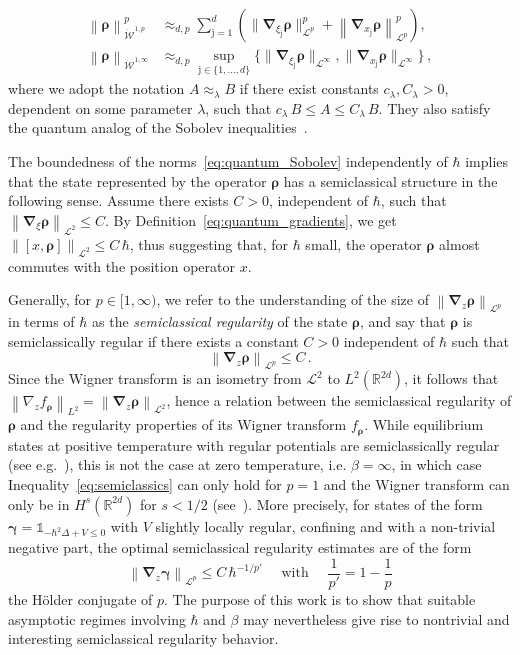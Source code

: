 \documentclass[11pt]{amsart}
\theoremstyle{plain}
\theoremstyle{definition}
\newcommand		{\N}		{\mathbb N}			%
\newcommand		{\RR}		{\mathbb R}			%
\newcommand		{\R}		{\RR}
\newcommand		{\Rdd}		{\R^{2d}}
\renewcommand	{\L}		{\mathcal L}		%
\newcommand		{\cW}		{\mathcal W}		%
\newcommand		{\lt}			{\left}				%
\newcommand		{\rt}			{\right}			%
\renewcommand	{\(}			{\lt(}
\renewcommand	{\)}			{\rt)}
\newcommand		{\com}[1]		{\lt[{#1}\rt]}		%
\newcommand		{\snrm}[1]		{\lVert #1 \rVert}			%
\newcommand		{\nrm}[1]		{\lt\lVert #1\rt\rVert}
\newcommand		{\Nrm}[2]		{\nrm{#1}_{#2}}
\newcommand		{\sNrm}[2]		{\snrm{#1}_{#2}}
\newcommand		{\indic}	{\mathds{1}}		%
\newcommand		{\jj}			{\mathrm{j}}	%
\newcommand		{\op}		{{\boldsymbol{\rho}}}%
\newcommand		{\opgam}	{{\boldsymbol{\gamma}}}	%
\newcommand		{\Dh}		{\boldsymbol{\nabla}}	%
\newcommand		{\Dhv}[1]	{\Dh_{\!\xi} #1}		%
\newcommand		{\Dhz}[1]	{\Dh_{\!z} #1}
\newcommand		{\Dhxj}[1]	{\Dh_{\!x_\jj} #1}		%
\newcommand		{\Dhvj}[1]	{\Dh_{\!\xi_\jj} #1}	%
\begin{document}
	\begin{equation}\label{eq:Sobolev_equiv_norm}
	\begin{split}
		\Nrm{\op}{\dot{\cW}^{1,p}}^p &\approx_{d,p} \sum_{\jj=1}^d \left( \sNrm{\Dhvj{\op}}{\L^p}^p + \Nrm{\Dhxj{\op}}{\L^p}^p \right),
		\\
		\Nrm{\op}{\dot{\cW}^{1,\infty}} &\approx_{d,p} \sup_{\jj\in \{1,\dots,d\}} \bigl\{ \sNrm{\Dhvj{\op}}{\L^\infty} , \sNrm{\Dhxj{\op}}{\L^\infty}\bigr\} \,,
	\end{split}
	\end{equation}
	where we adopt the notation $A \approx_\lambda B$ if there exist constants $c_\lambda, C_\lambda>0$, dependent on some parameter $\lambda$, such that  $c_\lambda \, B \leq A \leq C_\lambda \, B$. They also satisfy the quantum analog of the Sobolev inequalities~\cite{lafleche_quantum_2024}.
	
	The boundedness of the norms~\eqref{eq:quantum_Sobolev} independently of $\hbar$ implies that the state represented by the operator $\op$ has a semiclassical structure in the following sense. Assume there exists $C>0$, independent of $\hbar$, such that $\Nrm{\Dhv\op}{\L^2}\leq C$. By Definition~\eqref{eq:quantum_gradients}, we get $\Nrm{\com{x,\op}}{\L^2}\leq C\,\hbar$, thus suggesting that, for $\hbar$ small, the operator $\op$ almost commutes with the position operator $x$.
	
	Generally, for $p\in[1,\infty)$, we refer to the understanding of the size of $\Nrm{\Dhz\op}{\L^p}$ in terms of $\hbar$ as the {\it semiclassical regularity} of the state $\op$, and say that $\op$ is semiclassically regular if there exists a constant $C>0$ independent of $\hbar$ such that
	\begin{equation}\label{eq:semiclassics}
		\Nrm{\Dhz\op}{\L^p} \leq C \, .
	\end{equation}
	Since the Wigner transform is an isometry from $\L^2$ to $L^2(\Rdd)$, it follows that $\Nrm{\nabla_z f_{\op}}{L^2} = \Nrm{\Dhz\op}{\L^2}$, hence a relation between the semiclassical regularity of $\op$ and the regularity properties of its Wigner transform $f_{\op}$. While equilibrium states at positive temperature with regular potentials are semiclassically regular (see e.g.~\cite{chong_semiclassical_2023}), this is not the case at zero temperature, i.e. $\beta=\infty$, in which case Inequality~\eqref{eq:semiclassics} can only hold for $p=1$ and the Wigner transform can only be in $H^s(\Rdd)$ for $s<1/2$ (see~\cite{lafleche_optimal_2024}). More precisely, for states of the form $\opgam = \indic_{-\hbar^2\Delta+V\leq 0}$ with $V$ slightly locally regular, confining and with a non-trivial negative part, the optimal semiclassical regularity estimates are of the form~\cite{fournais_optimal_2020, cardenas_commutator_2025}
	\begin{equation*}
		\Nrm{\Dhz\opgam}{\L^p} \leq C \, \hbar^{-1/p'}  \quad \text{ with } \quad \frac{1}{p'} = 1 - \frac{1}{p}
	\end{equation*}
    the Hölder conjugate of $p$. The purpose of this work is to show that suitable asymptotic regimes involving $\hbar$ and $\beta$ may nevertheless give rise to nontrivial and interesting semiclassical regularity behavior.
	
\end{document}
